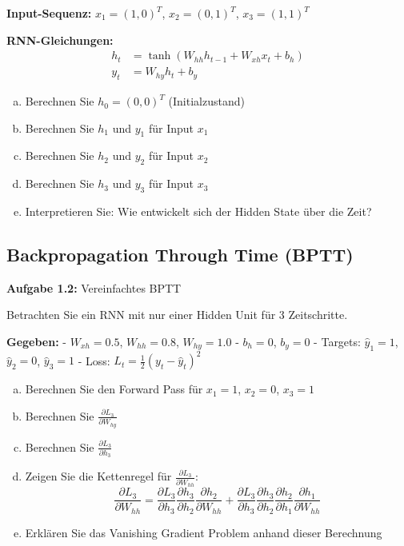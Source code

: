 \documentclass[12pt,a4paper]{article}
\begin{document}
\textbf{Input-Sequenz:} $x_1 = (1, 0)^T$, $x_2 = (0, 1)^T$, $x_3 = (1, 1)^T$

\textbf{RNN-Gleichungen:}
\begin{align}
h_t &= \tanh(W_{hh} h_{t-1} + W_{xh} x_t + b_h) \\
y_t &= W_{hy} h_t + b_y
\end{align}

\begin{enumerate}[(a)]
    \item Berechnen Sie $h_0 = (0, 0)^T$ (Initialzustand)
    \item Berechnen Sie $h_1$ und $y_1$ für Input $x_1$
    \item Berechnen Sie $h_2$ und $y_2$ für Input $x_2$  
    \item Berechnen Sie $h_3$ und $y_3$ für Input $x_3$
    \item Interpretieren Sie: Wie entwickelt sich der Hidden State über die Zeit?
\end{enumerate}

\subsection{Backpropagation Through Time (BPTT)}

\textbf{Aufgabe 1.2:} Vereinfachtes BPTT

Betrachten Sie ein RNN mit nur einer Hidden Unit für 3 Zeitschritte.

\textbf{Gegeben:}
- $W_{xh} = 0.5$, $W_{hh} = 0.8$, $W_{hy} = 1.0$
- $b_h = 0$, $b_y = 0$
- Targets: $\hat{y}_1 = 1$, $\hat{y}_2 = 0$, $\hat{y}_3 = 1$
- Loss: $L_t = \frac{1}{2}(y_t - \hat{y}_t)^2$

\begin{enumerate}[(a)]
    \item Berechnen Sie den Forward Pass für $x_1 = 1$, $x_2 = 0$, $x_3 = 1$
    \item Berechnen Sie $\frac{\partial L_3}{\partial W_{hy}}$
    \item Berechnen Sie $\frac{\partial L_3}{\partial h_3}$
    \item Zeigen Sie die Kettenregel für $\frac{\partial L_3}{\partial W_{hh}}$:
    $$\frac{\partial L_3}{\partial W_{hh}} = \frac{\partial L_3}{\partial h_3} \frac{\partial h_3}{\partial h_2} \frac{\partial h_2}{\partial W_{hh}} + \frac{\partial L_3}{\partial h_3} \frac{\partial h_3}{\partial h_2} \frac{\partial h_2}{\partial h_1} \frac{\partial h_1}{\partial W_{hh}}$$
    \item Erklären Sie das Vanishing Gradient Problem anhand dieser Berechnung
\end{enumerate}
\end{document}
